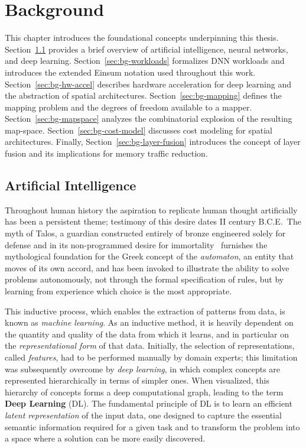  
\chapter{Background}
\label{ch:background}

This chapter introduces the foundational concepts underpinning this thesis.
Section~\ref{sec:bg-ai} provides a brief overview of artificial intelligence,
neural networks, and deep learning.
Section~\ref{sec:bg-workloads} formalizes DNN workloads and introduces the
extended Einsum notation used throughout this work.
Section~\ref{sec:bg-hw-accel} describes hardware acceleration for deep
learning and the abstraction of spatial architectures.
Section~\ref{sec:bg-mapping} defines the mapping problem and the degrees of
freedom available to a mapper.
Section~\ref{sec:bg-mapspace} analyzes the combinatorial explosion of the
resulting map-space.
Section~\ref{sec:bg-cost-model} discusses cost modeling for spatial
architectures.
Finally, Section~\ref{sec:bg-layer-fusion} introduces the concept of layer
fusion and its implications for memory traffic reduction.

\section{Artificial Intelligence}
\label{sec:bg-ai}

Throughout human history the aspiration to replicate human thought artificially has been a persistent theme; testimony of this desire dates II century B.C.E.\ The myth of Talos, a guardian constructed entirely of bronze engineered solely for defense 
and in its non-programmed desire for immortality~\cite{talos} furnishes the mythological foundation for the Greek concept of the \emph{automaton}, an entity that moves of its own accord, and has been
invoked to illustrate the ability to solve problems autonomously, not through
the formal specification of rules, but by learning from experience which
choice is the most appropriate.

This inductive process, which enables the extraction of patterns from data,
is known as \emph{machine learning}.
As an inductive method, it is heavily dependent on the quantity and quality of
the data from which it learns, and in particular on the
\emph{representational form} of that data.
Initially, the selection of representations, called \emph{features}, had to
be performed manually by domain experts; this limitation was
subsequently overcome by \emph{deep learning},
in which complex concepts are represented hierarchically in terms of simpler
ones.
When visualized, this hierarchy of concepts forms a deep computational graph,
leading to the term \textbf{Deep Learning} (DL).
The fundamental principle of DL is to learn an efficient \emph{latent
representation} of the input data, one designed to capture the essential
semantic information required for a given task and to transform the problem
into a space where a solution can be more easily discovered.

